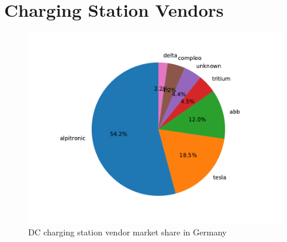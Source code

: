 \documentclass[conference,flushend]{iaria} %
\begin{document}



\section{Charging Station Vendors}
\begin{figure}[ht]
    \centering
    \includegraphics[width=.489\textwidth]{graphs/market_analysis.pdf}
    \caption{DC charging station vendor market share in Germany}
    \label{fig:marketshare}
\end{figure}
\end{document}
